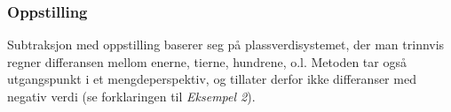 \subsubsection{Oppstilling}
Subtraksjon med oppstilling baserer seg på plassverdisystemet, der man trinnvis regner differansen mellom enerne, tierne, hundrene, o.l. Metoden tar også utgangspunkt i et mengdeperspektiv, og tillater derfor ikke differanser med negativ verdi (se forklaringen til \textsl{Eksempel 2}).
\begin{center}
	\parbox{0.3\linewidth}{
} \qquad
\parbox{0.3\linewidth}{
} \\[12pt]
\parbox{0.3\linewidth}{
}\qquad
\parbox{0.3\linewidth}{
}

\end{center}

